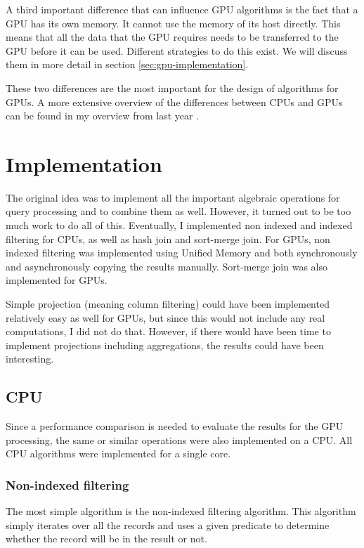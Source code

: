 \documentclass[a4paper,titlepage]{article}
\begin{document}
A third important difference that can influence GPU algorithms is the fact that a GPU has its own memory. It cannot use the memory of its host directly. This means that all the data that the GPU requires needs to be transferred to the GPU before it can be used. Different strategies to do this exist. We will discuss them in more detail in section \ref{sec:gpu-implementation}.

These two differences are the most important for the design of algorithms for GPUs. A more extensive overview of the differences between CPUs and GPUs can be found in my overview from last year \cite{kostjens2015}.


\section{Implementation}
\label{sec:implementation}
The original idea was to implement all the important algebraic operations for query processing and to combine them as well. However, it turned out to be too much work to do all of this. Eventually, I implemented non indexed and indexed filtering for CPUs, as well as hash join and sort-merge join. For GPUs, non indexed filtering was implemented using Unified Memory and both synchronously and asynchronously copying the results manually. Sort-merge join was also implemented for GPUs.

Simple projection (meaning column filtering) could have been implemented relatively easy as well for GPUs, but since this would not include any real computations, I did not do that. However, if there would have been time to implement projections including aggregations, the results could have been interesting.

\subsection{CPU}
Since a performance comparison is needed to evaluate the results for the GPU processing, the same or similar operations were also implemented on a CPU. All CPU algorithms were implemented for a single core.

\subsubsection{Non-indexed filtering}
The most simple algorithm is the non-indexed filtering algorithm. This algorithm simply iterates over all the records and uses a given predicate to determine whether the record will be in the result or not.
\end{document}
